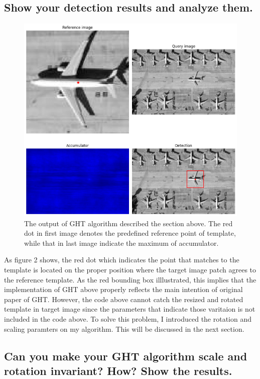 \documentclass[10pt]{article}
\begin{document}
\subsection*{Show your detection results and analyze them.}
\begin{figure}[!h]
    \begin{center}
        \includegraphics*[scale = 0.4]{../hw2/fig2.png}
    \end{center}
    \caption{The output of GHT algorithm described the section above. The red dot in first image denotes the predefined reference point of template, while that in last image indicate the maximum of accumulator. }
\end{figure}
As figure 2 shows, the red dot which indicates the point that matches to the template is located on the proper position where the target image patch agrees to the reference template. 
As the red bounding box illlustrated, this implies that the implementation of GHT above properly reflects the main intention of original paper of GHT.
However, the code above cannot catch the resized and rotated template in target image since the parameters that indicate those varitaion is not included in the code above.
To solve this problem, I introduced the rotation and scaling paramters on my algorithm. This will be discussed in the next section.  

\subsection*{Can you make your GHT algorithm scale and rotation invariant? How? Show the results.}
\end{document}
